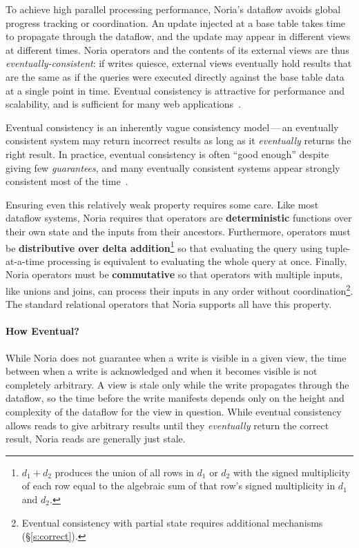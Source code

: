 To achieve high parallel processing performance, Noria's dataflow avoids
global progress tracking or coordination. An update injected at a base table
takes time to propagate through the dataflow, and the update may appear in
different views at different times. Noria operators and the contents of its
external views are thus \emph{eventually-consistent}: if writes quiesce,
external views eventually hold results that are the same as if the queries were
executed directly against the base table data at a single point in time.
Eventual consistency is attractive for performance and scalability, and is
sufficient for many web applications~\cite{eventually-consistent,
facebook-memcache, pnuts}.


Eventual consistency is an inherently vague consistency model\,---\,an
eventually consistent system may return incorrect results as long as it
\emph{eventually} returns the right result. In practice, eventual consistency is
often ``good enough'' despite giving few \emph{guarantees}, and many eventually
consistent systems appear strongly consistent most of the time~\cite{eventual}.

Ensuring even this relatively weak property requires some care. Like most
dataflow systems, Noria requires that operators are \textbf{deterministic}
functions over their own state and the inputs from their ancestors. Furthermore,
operators must be \textbf{distributive over delta addition}\footnote{$d_1 + d_2$
produces the union of all rows in $d_1$ or $d_2$ with the signed multiplicity of
each row equal to the algebraic sum of that row's signed multiplicity in $d_1$
and $d_2$.} so that evaluating the query using tuple-at-a-time processing is
equivalent to evaluating the whole query at once. Finally, Noria operators must
be \textbf{commutative} so that operators with multiple inputs, like unions and
joins, can process their inputs in any order without
coordination\footnote{Eventual consistency with partial state requires
additional mechanisms (\S\ref{s:correct}).}. The standard relational operators
that Noria supports all have this property.

\paragraph{How Eventual?}
While Noria does not guarantee when a write is visible in a given view, the time
between when a write is acknowledged and when it becomes visible is not
completely arbitrary. A view is stale only while the write propagates through
the dataflow, so the time before the write manifests depends only on the height
and complexity of the dataflow for the view in question. While eventual
consistency allows reads to give arbitrary results until they \emph{eventually}
return the correct result, Noria reads are generally just stale.

